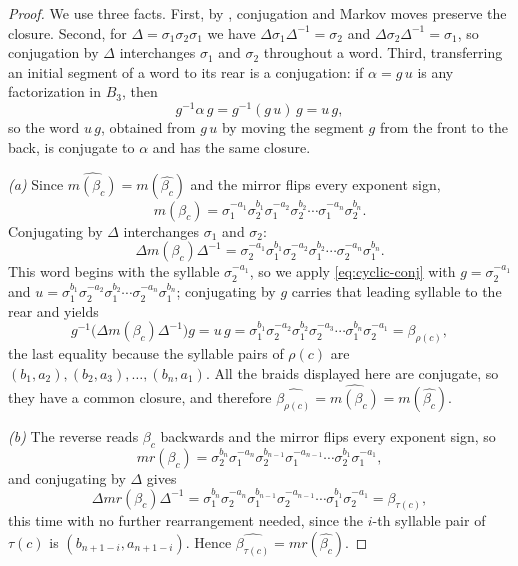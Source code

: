 \documentclass[11pt]{article}
\theoremstyle{definition}
\begin{document}
\begin{proof}
We use three facts. First, by , conjugation and Markov moves preserve
the closure. Second, for $\Delta=\sigma_{1}\sigma_{2}\sigma_{1}$ we have
$\Delta\sigma_{1}\Delta^{-1}=\sigma_{2}$ and $\Delta\sigma_{2}\Delta^{-1}=\sigma_{1}$, so
conjugation by $\Delta$ interchanges $\sigma_{1}$ and $\sigma_{2}$ throughout a word.
Third, transferring an initial segment of a word to its rear is a conjugation: if
$\alpha=g\,u$ is any factorization in $B_{3}$, then
\begin{equation}\label{eq:cyclic-conj}
g^{-1}\alpha\,g=g^{-1}(g\,u)\,g=u\,g ,
\end{equation}
so the word $u\,g$, obtained from $g\,u$ by moving the segment $g$ from the front to the
back, is conjugate to $\alpha$ and has the same closure.

\smallskip
\noindent\emph{\textup{(a)}} Since $\widehat{m(\beta_c)}=m(\widehat{\beta_c})$ and the
mirror flips every exponent sign,
\[
m(\beta_c)=\sigma_{1}^{-a_1}\sigma_{2}^{b_1}\sigma_{1}^{-a_2}\sigma_{2}^{b_2}\cdots
\sigma_{1}^{-a_n}\sigma_{2}^{b_n}.
\]
Conjugating by $\Delta$ interchanges $\sigma_{1}$ and $\sigma_{2}$:
\[
\Delta m(\beta_c)\Delta^{-1}
=\sigma_{2}^{-a_1}\sigma_{1}^{b_1}\sigma_{2}^{-a_2}\sigma_{1}^{b_2}\cdots
\sigma_{2}^{-a_n}\sigma_{1}^{b_n}.
\]
This word begins with the syllable $\sigma_{2}^{-a_1}$, so we apply
\eqref{eq:cyclic-conj} with $g=\sigma_{2}^{-a_1}$ and
$u=\sigma_{1}^{b_1}\sigma_{2}^{-a_2}\sigma_{1}^{b_2}\cdots\sigma_{2}^{-a_n}\sigma_{1}^{b_n}$;
conjugating by $g$ carries that leading syllable to the rear and yields
\[
g^{-1}\bigl(\Delta m(\beta_c)\Delta^{-1}\bigr)g
=u\,g
=\sigma_{1}^{b_1}\sigma_{2}^{-a_2}\sigma_{1}^{b_2}\sigma_{2}^{-a_3}\cdots
\sigma_{1}^{b_n}\sigma_{2}^{-a_1}
=\beta_{\rho(c)} ,
\]
the last equality because the syllable pairs of $\rho(c)$ are
$(b_1,a_2),(b_2,a_3),\dots,(b_n,a_1)$. All the braids displayed here are conjugate, so
they have a common closure, and therefore
$\widehat{\beta_{\rho(c)}}=\widehat{m(\beta_c)}=m(\widehat{\beta_c})$.

\smallskip
\noindent\emph{\textup{(b)}} The reverse reads $\beta_c$ backwards and the mirror flips
every exponent sign, so
\[
mr(\beta_c)
=\sigma_{2}^{b_n}\sigma_{1}^{-a_n}\sigma_{2}^{b_{n-1}}\sigma_{1}^{-a_{n-1}}\cdots
\sigma_{2}^{b_1}\sigma_{1}^{-a_1},
\]
and conjugating by $\Delta$ gives
\[
\Delta mr(\beta_c)\Delta^{-1}
=\sigma_{1}^{b_n}\sigma_{2}^{-a_n}\sigma_{1}^{b_{n-1}}\sigma_{2}^{-a_{n-1}}\cdots
\sigma_{1}^{b_1}\sigma_{2}^{-a_1}=\beta_{\tau(c)},
\]
this time with no further rearrangement needed, since the $i$-th syllable pair of
$\tau(c)$ is $(b_{n+1-i},a_{n+1-i})$. Hence
$\widehat{\beta_{\tau(c)}}=mr(\widehat{\beta_c})$.


\end{proof}
\end{document}
